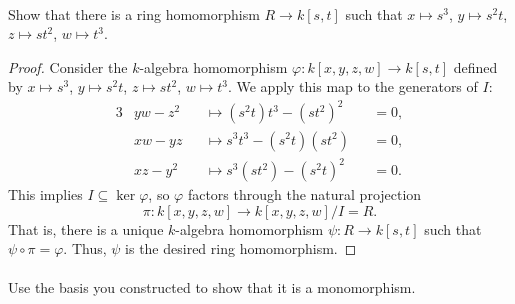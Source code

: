 \documentclass[12pt]{article}
\newlength{\myparskip}
\newenvironment{fullbox}{\begin{lrbox}{\savefullbox}\begin{minipage}{\dimexpr\textwidth-2\fboxsep\relax}\setlength{\parskip}{\myparskip}}{\end{minipage}\end{lrbox}\framebox[\textwidth]{\usebox{\savefullbox}}}
\newenvironment{pbox}[1][]{\begin{fullbox}\ifx#1\empty\else\paragraph{#1}\fi}{\end{fullbox}}
\renewcommand{\phi}{\varphi}
\newcommand{\<}{\langle}
\renewcommand{\>}{\rangle}
\begin{document}
\newpage
\begin{pbox}
    Show that there is a ring homomorphism $R \to k[s, t]$ such that $x \mapsto s^3$, $y \mapsto s^2t$, $z \mapsto st^2$, $w \mapsto t^3$.
\end{pbox}

\begin{proof}
    Consider the $k$-algebra homomorphism $\phi : k[x, y, z, w] \to k[s, t]$ defined by $x \mapsto s^3$, $y \mapsto s^2t$, $z \mapsto st^2$, $w \mapsto t^3$. We apply this map to the generators of $I$:
    \begin{alignat*}{3}
        & yw - z^2  & &\longmapsto (s^2t)t^3 - (st^2)^2     & &= 0, \\
        & xw - yz   & &\longmapsto s^3t^3 - (s^2t)(st^2)    & &= 0, \\
        & xz - y^2  & &\longmapsto s^3(st^2) - (s^2t)^2     & &= 0.
    \end{alignat*}
    This implies $I \subseteq \ker\phi$, so $\phi$ factors through the natural projection
    \[
        \pi : k[x, y, z, w] \to k[x, y, z, w]/I = R.
    \]
    That is, there is a unique $k$-algebra homomorphism $\psi : R \to k[s, t]$ such that $\psi \circ \pi = \phi$. Thus, $\psi$ is the desired ring homomorphism.

\end{proof}

\begin{pbox}
    Use the basis you constructed to show that it is a monomorphism.
\end{pbox}
\end{document}
